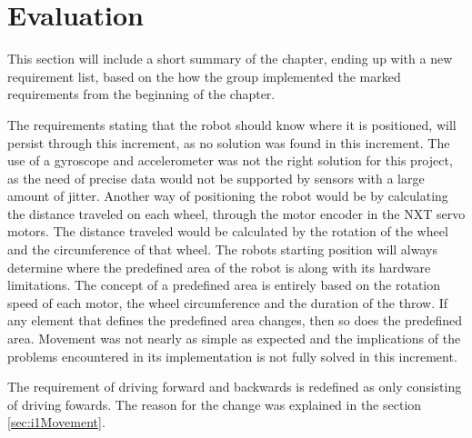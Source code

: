 \section{Evaluation}
\label{sec:i1Evaluation}
This section will include a short summary of the chapter, ending up with a new requirement list, based on the how the group implemented the marked requirements from the beginning of the chapter.


The requirements stating that the robot should know where it is positioned, will persist through this increment, as no solution was found in this increment. The use of a gyroscope and accelerometer was not the right solution for this project, as the need of precise data would not be supported by sensors with a large amount of jitter. Another way of positioning the robot would be by calculating the distance traveled on each wheel, through the motor encoder in the NXT servo motors. The distance traveled would be calculated by the rotation of the wheel and the circumference of that wheel.
The robots starting position will always determine where the predefined area of the robot is along with its hardware limitations. The concept of a predefined area is entirely based on the rotation speed of each motor, the wheel circumference and the duration of the throw. If any element that defines the predefined area changes, then so does the predefined area. Movement was not nearly as simple as expected and the implications of the problems encountered in its implementation is not fully solved in this increment.

The requirement of driving forward and backwards is redefined as only consisting of driving fowards. The reason for the change was explained in the section \ref{sec:i1Movement}.

